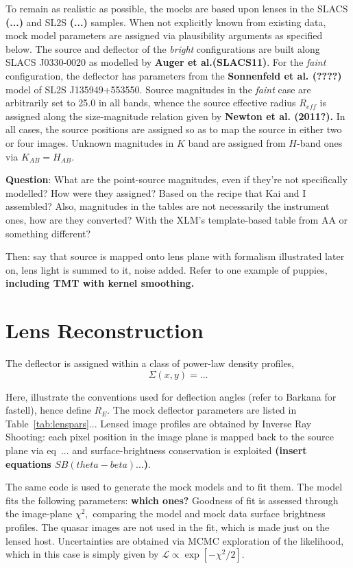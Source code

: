 \documentclass[a4paper,11pt]{article}
\begin{document}
To remain as realistic as possible, the mocks are based upon lenses in the SLACS \textbf{(...)} and SL2S \textbf{(...)} samples. When not explicitly known from existing data, mock model parameters are assigned via plausibility arguments as specified below. The source and deflector of the \textit{bright} configurations are built along SLACS J0330-0020 as modelled by \textbf{Auger et al.(SLACS11)}. For the \textit{faint} configuration, the deflector has parameters from the \textbf{Sonnenfeld et al. (????)} model of SL2S J135949+553550.
 Source magnitudes in the \textit{faint} case are arbitrarily set to 25.0 in all bands, whence the source effective radius $R_{eff}$ is assigned along the size-magnitude relation given by \textbf{Newton et al. (2011?).} In all cases, the source positions are assigned so as to map the source in either two or four images. Unknown magnitudes in $K$ band are assigned from $H$-band ones via $K_{AB}=H_{AB}.$
 
\textbf{Question}: What are the point-source magnitudes, even if they're not specifically modelled? How were they assigned?
 Based on the recipe that Kai and I assembled? Also, magnitudes in the tables are not necessarily the instrument ones, how are they converted? With the XLM's template-based table from AA or something different?

Then: say that source is mapped onto lens plane with formalism illustrated later on, lens light is summed to it, noise added. Refer to one example of puppies, \textbf{including TMT with kernel smoothing.}

\section{Lens Reconstruction}
The deflector is assigned within a class of power-law density profiles,
\begin{equation}
\Sigma(x,y)=...
\end{equation}

Here, illustrate the conventions used for deflection angles (refer to Barkana for fastell), hence define $R_E.$ The mock deflector parameters are listed in Table~\ref{tab:lenspars}...
Lensed image profiles are obtained by Inverse Ray Shooting: each pixel position in the image plane is mapped back to the source plane via eq~... and surface-brightness conservation is exploited \textbf{(insert equations $SB(theta-beta)...$)}.

The same code is used to generate the mock models and to fit them. The model fits the following parameters: \textbf{which ones?}  Goodness of fit is assessed through the image-plane $\chi^{2},$ comparing the model and mock data surface brightness profiles. The quasar images are not used in the fit, which is made just on the lensed host. Uncertainties are obtained via MCMC exploration of the likelihood, which in this case is simply given by $\mathcal{L}\propto\exp[-\chi^{2}/2].$
\end{document}
